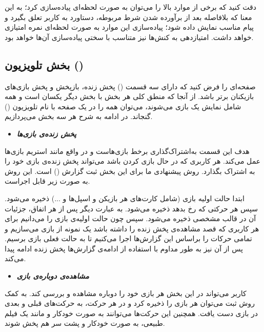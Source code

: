 \documentclass[]{article}
\begin{document}
\begin{tcolorbox}[colback=green!5!white,colframe=green!75!black,title=\textbf{نکته}]
	دقت کنید که برخی از موارد بالا را می‌توان به صورت لحظه‌ای  پیاده‌سازی کرد؛ به این معنا که بلافاصله بعد از برآورده شدن شرط مربوطه، دستاورد به کاربر تعلق بگیرد و پیام مناسب نمایش داده شود؛ پیاده‌سازی این موارد به صورت لحظه‌ای نمره امتیازی خواهد داشت. امتیازدهی به کنش‌ها نیز متناسب با سختی پیاده‌سازی آن‌ها خواهد بود.
\end{tcolorbox}

\subsection*{{\titr بخش تلویزیون ()}}

صفحه‌ای را فرض کنید که دارای سه قسمت () پخش زنده، باز‌پخش و پخش‌ بازی‌های بازیکنان برتر باشد.
از آنجا که منطق کلی هر بخش با بخش دیگر یکسان است و همه شامل نمایش یک بازی می‌شوند، می‌توان همه را در یک صفحه با نام تلویزیون () گنجاند. در ادامه به شرح هر سه بخش می‌پردازیم.
\\

\begin{itemize}
	\item \textbf{\emph{پخش زنده‌ی بازی‌ها}}
\end{itemize}
هدف این قسمت به‌اشتراک‌گذاری برخط بازی‌هاست و در واقع مانند استریم بازی‌ها عمل می‌کند. هر کاربری که در حال بازی کردن باشد می‌تواند پخش زنده‌ی بازی خود را به اشتراک بگذارد.
روش‌ پیشنهادی ما برای این بخش ثبت گزارش () است. این روش به صورت زیر قابل اجراست.

ابتدا حالت اولیه بازی (شامل کارت‌های هر بازیکن و اسپل‌ها و ...) ذخیره می‌شود. 
سپس هر حرکتی که رخ بدهد ذخیره می‌شود. به عبارت دیگر پس از هر اتفاق، جزئیات آن در قالب مشخصی ذخیره می‌شود. سپس چون حالت اولیه‌ی بازی را می‌دانیم برای هر کاربری که قصد مشاهده‌ی پخش زنده را داشته باشد یک نمونه از بازی می‌سازیم و تمامی حرکات را براساس این گزارش‌ها اجرا می‌کنیم تا به حالت فعلی بازی برسیم. پس از آن نیز به طور مداوم با استفاده از ادامه‌ی گزارش‌ها پخش زنده ادامه پیدا می‌کند.
\\

\begin{itemize}
	\item \textbf{\emph{مشاهده‌ی دوباره‌ی بازی}}
\end{itemize}
کاربر می‌تواند در این بخش هر بازی خود را دوباره مشاهده و بررسی کند. 
به کمک روش ثبت  می‌توان هر بازی را ذخیره کرد و در هر حرکت، به حرکت‌های قبلی و بعدی در بازی دست یافت. همچنین این حرکت‌ها می‌توانند به صورت خودکار و مانند یک فیلم طبیعی، به صورت خودکار و پشت سر هم پخش شوند.
\\
\end{document}
